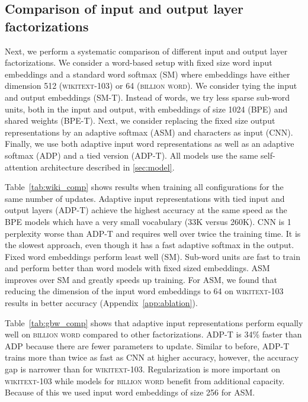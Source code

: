 \documentclass{article} \usepackage{iclr2019_conference,times}
\def\gbw{\textsc{billion word}}
\def\wiki{\textsc{wikitext-103}}
\def\sm{\textsc{SM}}
\def\smt{\textsc{SM-T}}
\def\bpe{\textsc{BPE}}
\def\bpet{\textsc{BPE-T}}
\def\asm{\textsc{ASM}}
\def\cnn{\textsc{CNN}}
\def\adp{\textsc{ADP}}
\def\adpt{\textsc{ADP-T}}
\begin{document}
\subsection{Comparison of input and output layer factorizations}

Next, we perform a systematic comparison of different input and output layer factorizations.
We consider a word-based setup with fixed size word input embeddings and a standard word softmax (\sm{}) where embeddings have either dimension 512 (\wiki{}) or 64 (\gbw{}). 
We consider tying the input and output embeddings (\smt{}).
Instead of words, we try less sparse sub-word units, both in the input and output, with embeddings of size 1024 (\bpe{}) and shared weights (\bpet{}).
Next, we consider replacing the fixed size output representations by an adaptive softmax (\asm{}) and characters as input (\cnn{}). 
Finally, we use both adaptive input word representations as well as an adaptive softmax (\adp{}) and a tied version (\adpt{}). All models use the same self-attention architecture described in \textsection\ref{sec:model}.

Table~\ref{tab:wiki_comp} shows results when training all configurations for the same number of updates.
Adaptive input representations with tied input and output layers (\adpt{}) achieve the highest accuracy at the same speed as the BPE models which have a very small vocabulary (33K versus 260K).
\cnn{} is 1 perplexity worse than \adpt{} and requires well over twice the training time.
It is the slowest approach, even though it has a fast adaptive softmax in the output.
Fixed word embeddings perform least well (\sm{}).
Sub-word units are fast to train and perform better than word models with fixed sized embeddings.
\asm{} improves over \sm{} and greatly speeds up training. 
For \asm{}, we found that reducing the dimension of the input word embeddings to 64 on \wiki{} results in better accuracy (Appendix~\ref{app:ablation}).

Table~\ref{tab:gbw_comp} shows that adaptive input representations perform equally well on \gbw{} compared to other factorizations. 
\adpt{} is 34\% faster than \adp{} because there are fewer parameters to update.
Similar to before, \adpt{} trains more than twice as fast as \cnn{} at higher accuracy, however, the accuracy gap is narrower than for \wiki{}.
Regularization is more important on \wiki{} while models for \gbw{} benefit from additional capacity.
Because of this we used input word embeddings of size 256 for \asm{}.
\end{document}
